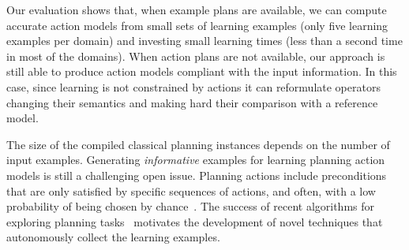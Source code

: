 \documentclass[letterpaper]{article} %
\newcommand{\strips}{\textsc{Strips}}     %
\begin{document}
Our evaluation shows that, when example plans are available, we can compute accurate action models from small sets of learning examples (only five learning examples per domain) and investing small learning times (less than a second time in most of the domains). When action plans are not available, our approach is still able to produce action models compliant with the input information. In this case, since learning is not constrained by actions it can reformulate operators changing their semantics and making hard their comparison with a reference model. %


The size of the compiled classical planning instances depends on the number of input examples. Generating {\em informative} examples for learning planning action models is still a challenging open issue. Planning actions include preconditions that are only satisfied by specific sequences of actions, and often, with a low probability of being chosen by chance~\cite{fern2004learning}. The success of recent algorithms for exploring planning tasks~\cite{geffner:novelty:IJCAI17} motivates the development of novel techniques that autonomously collect the learning examples.



\newpage



\end{document}

